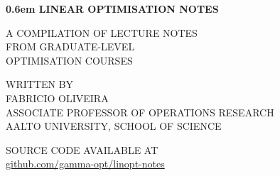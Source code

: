 \newcommand\nbvspace[1][3]{\vspace*{\stretch{#1}}}

\newcommand\nbstretchyspace{\spaceskip0.5em plus 0.25em minus 0.25em}

\newcommand{\nbtitlestretch}{\spaceskip0.6em}

\thispagestyle{empty}

\begin{center}
	\bfseries
	\nbvspace[1]
	\Huge
	{\nbtitlestretch\huge
	LINEAR OPTIMISATION NOTES}
	
	\nbvspace[1]
	\normalsize
	
	A COMPILATION OF LECTURE NOTES \\
	FROM GRADUATE-LEVEL \\
	OPTIMISATION COURSES 
	
	\nbvspace[1]
	\small WRITTEN BY\\
	\Large FABRICIO OLIVEIRA\\[0.5em]
	\footnotesize ASSOCIATE PROFESSOR OF OPERATIONS RESEARCH\\
	AALTO UNIVERSITY, SCHOOL OF SCIENCE
	
	\nbvspace[2]
	
	
	
	\normalsize
	
	SOURCE CODE AVAILABLE AT\\
	
	\large
	{\color{blue}\href{https://github.com/gamma-opt/linopt-notes}{github.com/gamma-opt/linopt-notes}}
	
	\nbvspace[1]
\end{center}




